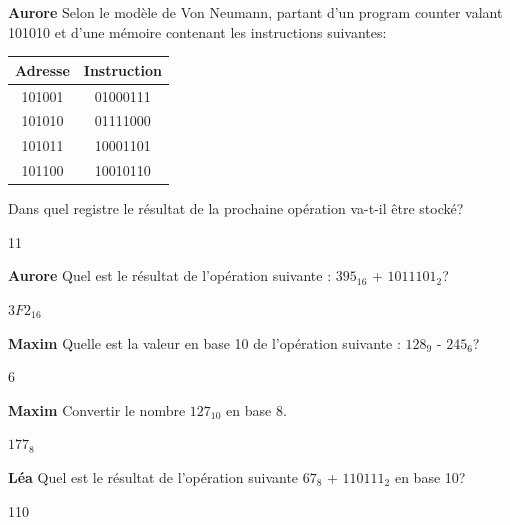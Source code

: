 \begin{Exercice}[10 minutes]\textbf{Aurore}
Selon le modèle de Von Neumann, partant d'un program counter valant 101010 et d'une mémoire contenant les instructions suivantes:
\begin{table}[h]
\centering
\begin{tabular}{|c|c|}
\hline
\textbf{Adresse} & \textbf{Instruction} \\
\hline
101001 & 01000111 \\ \hline
101010 & 01111000 \\ \hline
101011 & 10001101 \\ \hline
101100 & 10010110 \\ 
\hline
\end{tabular}
\end{table}

Dans quel registre le résultat de la prochaine opération va-t-il être stocké?


\begin{solution}
11
\end{solution}

\end{Exercice}

\begin{Exercice}[10 minutes]\textbf{Aurore} Quel est le résultat de l'opération suivante : $395_{16}$ + $1011101_{2}$?

\begin{solution}
$3F2_{16}$
\end{solution}
\end{Exercice}

\begin{Exercice}[10 minutes]\textbf{Maxim} Quelle est la valeur en base 10 de l’opération suivante : $128_9$ - $245_6$?
\begin{solution}
6
\end{solution}
\end{Exercice}

\begin{Exercice}[10 minutes]\textbf{Maxim}
Convertir le nombre $127_{10}$ en base 8.
\begin{solution}
$177_8$
\end{solution}
\end{Exercice}

\begin{Exercice}[10 minutes]\textbf{Léa}
Quel est le résultat de l'opération suivante $67_8$ + $110111_2$ en base 10? 
\begin{solution}
    110
\end{solution}
\end{Exercice}

